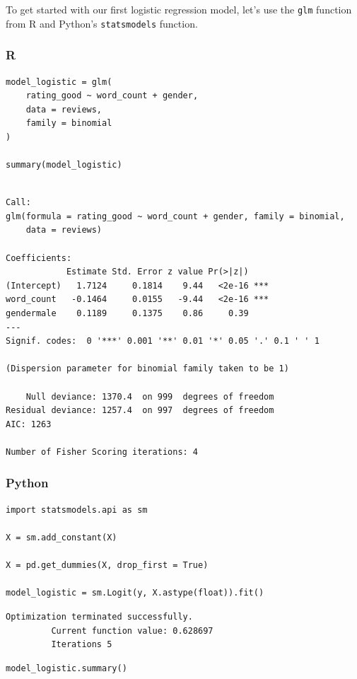 \documentclass[
  letterpaper,
]{krantz}
\begin{document}
To get started with our first logistic regression model, let's use the
\texttt{glm} function from R and Python's \texttt{statsmodels} function.

\subsubsection{R}

\begin{verbatim}
model_logistic = glm(
    rating_good ~ word_count + gender, 
    data = reviews,
    family = binomial
)

summary(model_logistic)
\end{verbatim}

\begin{verbatim}

Call:
glm(formula = rating_good ~ word_count + gender, family = binomial, 
    data = reviews)

Coefficients:
            Estimate Std. Error z value Pr(>|z|)    
(Intercept)   1.7124     0.1814    9.44   <2e-16 ***
word_count   -0.1464     0.0155   -9.44   <2e-16 ***
gendermale    0.1189     0.1375    0.86     0.39    
---
Signif. codes:  0 '***' 0.001 '**' 0.01 '*' 0.05 '.' 0.1 ' ' 1

(Dispersion parameter for binomial family taken to be 1)

    Null deviance: 1370.4  on 999  degrees of freedom
Residual deviance: 1257.4  on 997  degrees of freedom
AIC: 1263

Number of Fisher Scoring iterations: 4
\end{verbatim}

\subsubsection{Python}

\begin{verbatim}
import statsmodels.api as sm

X = sm.add_constant(X)

X = pd.get_dummies(X, drop_first = True)

model_logistic = sm.Logit(y, X.astype(float)).fit()
\end{verbatim}

\begin{verbatim}
Optimization terminated successfully.
         Current function value: 0.628697
         Iterations 5
\end{verbatim}

\begin{verbatim}
model_logistic.summary()
\end{verbatim}
\end{document}
